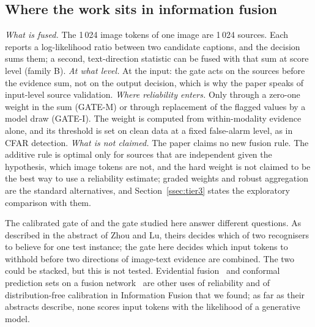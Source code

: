 \subsection{Where the work sits in information fusion}\label{ssec:disc_fit}
\emph{What is fused.}
The 1\,024 image tokens of one image are 1\,024 sources.
Each reports a log-likelihood ratio between two candidate captions, and the decision sums them; a second, text-direction statistic can
be fused with that sum at score level (family B).
\emph{At what level.}
At the input: the gate acts on the sources before the evidence sum, not on the output decision, which is why the paper speaks of
input-level source validation.
\emph{Where reliability enters.}
Only through a zero-one weight in the sum (GATE-M) or through replacement of the flagged values by a model draw (GATE-I).
The weight is computed from within-modality evidence alone, and its threshold is set on clean data at a fixed false-alarm level, as in
CFAR detection.
\emph{What is not claimed.}
The paper claims no new fusion rule.
The additive rule is optimal only for sources that are independent given the hypothesis, which image tokens are not, and the hard
weight is not claimed to be the best way to use a reliability estimate; graded weights and robust aggregation are the standard
alternatives, and Section~\ref{ssec:tier3} states the exploratory comparison with them.

The calibrated gate of \citet{zhou2027burden} and the gate studied here answer different questions.
As described in the abstract of Zhou and Lu, theirs decides which of two recognisers to believe for one test instance; the gate
here decides which input tokens to withhold before two directions of image-text evidence are combined.
The two could be stacked, but this is not tested.
Evidential fusion~\citep{shao2024ddef,huang2025evidential} and conformal prediction sets on a fusion network~\citep{wang2025multistage}
are other uses of reliability and of distribution-free calibration in Information Fusion that we found; as far as their abstracts describe,
none scores input tokens with the likelihood of a generative model.

